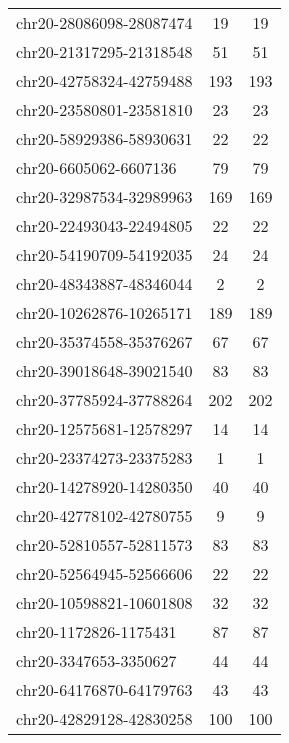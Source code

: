 \begin{longtable}{lSS}
	chr20-28086098-28087474 & 19     & 19                          \\
	chr20-21317295-21318548 & 51     & 51                          \\
	chr20-42758324-42759488 & 193    & 193                         \\
	chr20-23580801-23581810 & 23     & 23                          \\
	chr20-58929386-58930631 & 22     & 22                          \\
	chr20-6605062-6607136   & 79     & 79                          \\
	chr20-32987534-32989963 & 169    & 169                         \\
	chr20-22493043-22494805 & 22     & 22                          \\
	chr20-54190709-54192035 & 24     & 24                          \\
	chr20-48343887-48346044 & 2      & 2                           \\
	chr20-10262876-10265171 & 189    & 189                         \\
	chr20-35374558-35376267 & 67     & 67                          \\
	chr20-39018648-39021540 & 83     & 83                          \\
	chr20-37785924-37788264 & 202    & 202                         \\
	chr20-12575681-12578297 & 14     & 14                          \\
	chr20-23374273-23375283 & 1      & 1                           \\
	chr20-14278920-14280350 & 40     & 40                          \\
	chr20-42778102-42780755 & 9      & 9                           \\
	chr20-52810557-52811573 & 83     & 83                          \\
	chr20-52564945-52566606 & 22     & 22                          \\
	chr20-10598821-10601808 & 32     & 32                          \\
	chr20-1172826-1175431   & 87     & 87                          \\
	chr20-3347653-3350627   & 44     & 44                          \\
	chr20-64176870-64179763 & 43     & 43                          \\
	chr20-42829128-42830258 & 100    & 100                         \\

\end{longtable}
